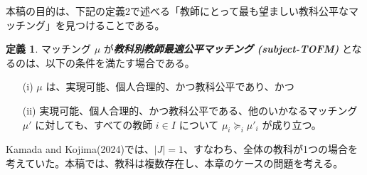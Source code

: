 \documentclass[12pt, a4paper]{article}
\theoremstyle{definition}
\newtheorem{defn}{定義}
\theoremstyle{remark}
\theoremstyle{plain}
\begin{document}








\bigbreak

本稿の目的は、下記の定義2で述べる「教師にとって最も望ましい教科公平なマッチング」を見つけることである。
\begin{defn}
マッチング $\mu$ が\textbf{\textit{教科別教師最適公平マッチング (subject-TOFM)}} となるのは、以下の条件を満たす場合である。
\begin{itemize}
    \item[(i)] $\mu$ は、実現可能、個人合理的、かつ教科公平であり、かつ
    \item[(ii)] 実現可能、個人合理的、かつ教科公平である、他のいかなるマッチング $\mu'$ に対しても、すべての教師 $i \in I$ について $\mu_i \succeq_i \mu'_i$ が成り立つ。
\end{itemize}
\end{defn}











Kamada and Kojima(2024)では、$|J| = 1$、すなわち、全体の教科が1つの場合を考えていた。本稿では、教科は複数存在し、本章のケースの問題を考える。
\end{document}
